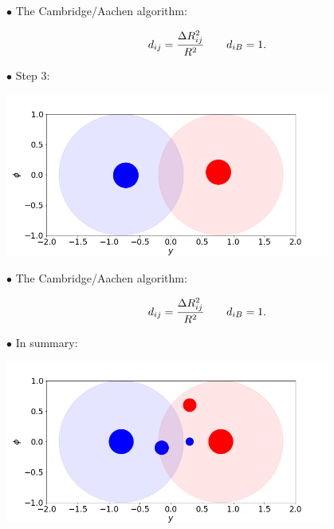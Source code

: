 \documentclass[9pt,a4paper,unknownkeysallowed,xcolor=dvipsnames,aspectratio=43]{beamer}
\begin{document}
%
%
\begin{frame}

{\color{darkred}\Large$\bullet$} {\color{darkred} The Cambridge/Aachen algorithm:}

  \begin{equation}
    d_{ij} = \frac{\Delta R_{ij}^2}{R^2}\qquad d_{iB} = 1.\notag
  \end{equation}
 \vspace{2mm}
  
{\color{darkred}\Large$\bullet$} Step 3:
\vspace{2mm}
\begin{center}
\includegraphics[width=0.8\textwidth]{ca3.png}
\end{center}
\end{frame}
%
%
\begin{frame}

{\color{darkred}\Large$\bullet$} {\color{darkred} The Cambridge/Aachen algorithm:}

  \begin{equation}
    d_{ij} = \frac{\Delta R_{ij}^2}{R^2}\qquad d_{iB} = 1.\notag
  \end{equation}
 \vspace{2mm}
  
{\color{darkred}\Large$\bullet$} In summary:
\vspace{2mm}
\begin{center}
\includegraphics[width=0.8\textwidth]{cacls.png}
\end{center}
\end{frame}
\end{document}
